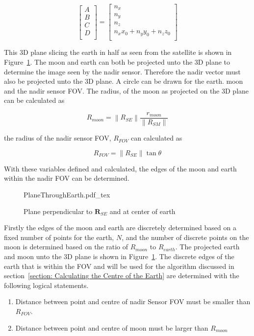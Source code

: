 \begin{equation}
\begin{bmatrix}
	A\\
	B\\
	C\\
	D\\
\end{bmatrix} = \begin{bmatrix}
n_x\\
n_y\\
n_z\\
n_xx_0 + n_yy_0 + n_zz_0\\
\end{bmatrix}
\end{equation}

This 3D plane slicing the earth in half as seen from the satellite is shown in Figure~\ref{fig:PlaneThroughEarth}. The moon and earth can both be projected unto the 3D plane to determine the image seen by the nadir sensor. Therefore the nadir vector must also be projected unto the 3D plane. A circle can be drawn for the earth. moon and the nadir sensor FOV. The radius, of the moon as projected on the 3D plane can be calculated as 

\begin{equation}
	R_{moon} = \left\lVert R_{SE} \right\rVert \frac{r_{moon}}{\left\lVert R_{SM} \right\rVert}
\end{equation}

the radius of the nadir sensor FOV, $R_{FOV}$ can calculated as 

\begin{equation}
	R_{FOV} = \left\lVert R_{SE} \right\rVert \tan \theta
\end{equation}

With these variables defined and calculated, the edges of the moon and earth within the nadir FOV can be determined.

\begin{figure}[!hbt]
	\centering
	\def\svgwidth{14cm}
	{PlaneThroughEarth.pdf_tex}
	\caption{Plane perpendicular to $\mathbf{R}_{SE}$ and at center of earth}
	\label{fig:PlaneThroughEarth}
\end{figure}

Firstly the edges of the moon and earth are discretely determined based on a fixed number of points for the earth, $N$, and the number of discrete points on the moon is determined based on the ratio of $R_{moon}$ to $R_{earth}$. The projected earth and moon unto the 3D plane is shown in Figure~\ref{fig:PlaneThroughEarth}. The discrete edges of the earth that is within the FOV and will be used for the algorithm discussed in section~\ref{section: Calculating the Centre of the Earth} are determined with the following logical statements.
\begin{enumerate}
	\item Distance between point and centre of nadir Sensor FOV must be smaller than $R_{FOV}$.
	\item Distance between point and centre of moon must be larger than $R_{moon}$
\end{enumerate}

